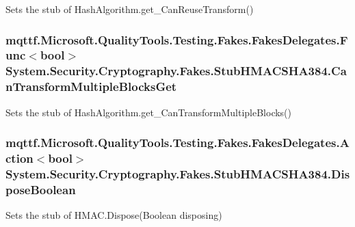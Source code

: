 Sets the stub of Hash\-Algorithm.\-get\-\_\-\-Can\-Reuse\-Transform()

\hypertarget{class_system_1_1_security_1_1_cryptography_1_1_fakes_1_1_stub_h_m_a_c_s_h_a384_a71fdd143b4addb23d34748541e4a3792}{
\subsubsection[{Can\-Transform\-Multiple\-Blocks\-Get}]{\setlength{\rightskip}{0pt plus 5cm}mqttf.\-Microsoft.\-Quality\-Tools.\-Testing.\-Fakes.\-Fakes\-Delegates.\-Func$<$bool$>$ System.\-Security.\-Cryptography.\-Fakes.\-Stub\-H\-M\-A\-C\-S\-H\-A384.\-Can\-Transform\-Multiple\-Blocks\-Get}}\label{class_system_1_1_security_1_1_cryptography_1_1_fakes_1_1_stub_h_m_a_c_s_h_a384_a71fdd143b4addb23d34748541e4a3792}


Sets the stub of Hash\-Algorithm.\-get\-\_\-\-Can\-Transform\-Multiple\-Blocks()

\hypertarget{class_system_1_1_security_1_1_cryptography_1_1_fakes_1_1_stub_h_m_a_c_s_h_a384_ad51af134c7d1ec35a7c3a5310639f1e8}{
\subsubsection[{Dispose\-Boolean}]{\setlength{\rightskip}{0pt plus 5cm}mqttf.\-Microsoft.\-Quality\-Tools.\-Testing.\-Fakes.\-Fakes\-Delegates.\-Action$<$bool$>$ System.\-Security.\-Cryptography.\-Fakes.\-Stub\-H\-M\-A\-C\-S\-H\-A384.\-Dispose\-Boolean}}\label{class_system_1_1_security_1_1_cryptography_1_1_fakes_1_1_stub_h_m_a_c_s_h_a384_ad51af134c7d1ec35a7c3a5310639f1e8}


Sets the stub of H\-M\-A\-C.\-Dispose(\-Boolean disposing)

